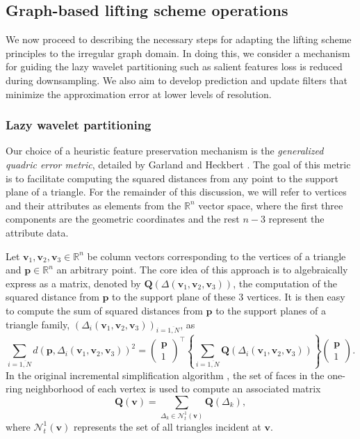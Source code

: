 \documentclass[graybox]{svmult}
\begin{document}
	\subsection{Graph-based lifting scheme operations}
	We now proceed to describing the necessary steps for adapting the lifting scheme principles to the irregular graph domain. In doing this, we consider a mechanism for guiding the lazy wavelet partitioning such as salient features loss is reduced during downsampling. We also aim to develop prediction and update filters that minimize the approximation error at lower levels of resolution.
	
	\subsubsection{Lazy wavelet partitioning}
	Our choice of a heuristic feature preservation mechanism is the
	\emph{generalized quadric error metric}, detailed by Garland and Heckbert \cite{Garland1998}. The goal of this metric is to facilitate computing the squared distances from any point to the support plane of a triangle. For the remainder of this discussion, we will refer to vertices and their attributes as elements from the $\mathbb{R}^n$ vector space, where the first three components are the geometric coordinates and the rest $n-3$ represent the attribute data.
	
	
	Let $\mathbf{v}_1, \mathbf{v}_2, \mathbf{v}_3 \in \mathbb{R}^n$ be column vectors corresponding to the vertices of a triangle and $\mathbf{p} \in \mathbb{R}^n$  an arbitrary point.
	The core idea of this approach is to algebraically express as a matrix, denoted by $\mathbf{Q}(\Delta(\mathbf{v}_1, \mathbf{v}_2, \mathbf{v}_3))$, the computation of the squared distance from  $\mathbf{p}$ to the support plane of these 3 vertices. It is then easy to compute the sum of squared distances from $\mathbf{p}$ to  the support planes of a triangle family, $\left( \Delta_i(\mathbf{v}_{1}, \mathbf{v}_{2}, \mathbf{v}_{3}) \right)_{i=\overline{1,N}}$, as
	\begin{equation}
	\sum\limits_{i=\overline{1,N}}{d(\mathbf{p},  \Delta_i(\mathbf{v}_{1}, \mathbf{v}_{2}, \mathbf{v}_{3}) )^2 } = 
	\begin{pmatrix} \mathbf{p} \\ 1 \end{pmatrix}^\intercal \left\{  \sum\limits_{i=\overline{1,N}} \mathbf{Q}\left(  \Delta_i(\mathbf{v}_{1}, \mathbf{v}_{2}, \mathbf{v}_{3}) \right) \right\} \begin{pmatrix} \mathbf{p} \\ 1 \end{pmatrix}.
	\label{eq_cds:quadric_addition}
	\end{equation}
	In the original incremental simplification algorithm \cite{Garland1998}, the set of faces in the one-ring neighborhood of each vertex is used to compute an associated matrix
	\begin{equation}
	\mathbf{Q(v)} = \sum\limits_{\Delta_k \in \mathcal{N}_t^1(\mathbf{v})}{ \mathbf{Q}(\Delta_k) },
	\label{eq_cds:vertex_quadric_error_matrix}
	\end{equation} 
	where $\mathcal{N}_t^1(\mathbf{v})$ represents the set of all triangles incident at $\mathbf{v}$.
	
\end{document}
